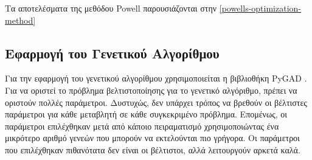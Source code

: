 Τα αποτελέσματα της μεθόδου \textlatin{Powell} παρουσιάζονται στην \autoref{powells-optimization-method}



\subsection{Εφαρμογή του Γενετικού Αλγορίθμου}
\label{applying-the-genetic-algorithm}

Για την εφαρμογή του γενετικού αλγορίθμου χρησιμοποιείται η βιβλιοθήκη \textlatin{PyGAD} \cite{gad2023pygad}. Για να οριστεί το πρόβλημα βελτιστοποίησης για το γενετικό αλγόριθμο, πρέπει να οριστούν πολλές παράμετροι. Δυστυχώς, δεν υπάρχει τρόπος να βρεθούν οι βέλτιστες παράμετροι για κάθε μεταβλητή σε κάθε συγκεκριμένο πρόβλημα. Επομένως, οι παράμετροι επιλέχθηκαν μετά από κάποιο πειραματισμό χρησιμοποιώντας ένα μικρότερο αριθμό γενεών που μπορούν να εκτελούνται πιο γρήγορα. Οι παράμετροι που επιλέχθηκαν πιθανότατα δεν είναι οι βέλτιστοι, αλλά λειτουργούν αρκετά καλά.

